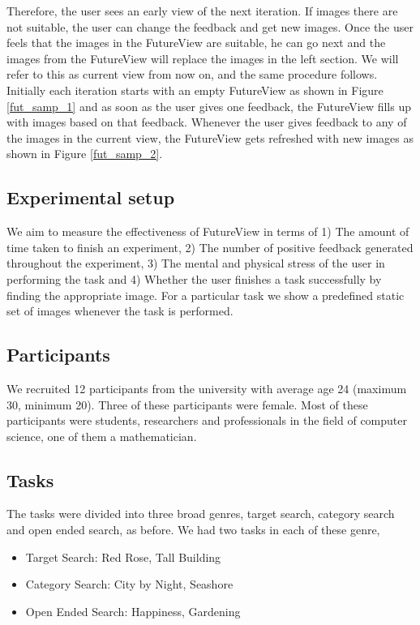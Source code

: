 \documentclass[english]{tktltiki}
\begin{document}
Therefore, the user sees an early view of the next iteration. If images there are not suitable, the user can change the feedback and get new images. Once the user feels that the images in the FutureView are suitable, he can go next and the images from the FutureView will replace the images in the left section. We will refer to this as current view from now on, and the same procedure follows. Initially each iteration starts with an empty FutureView as shown in Figure \ref{fut_samp_1} and as soon as the user gives one feedback, the FutureView fills up with images based on that feedback. Whenever the user gives feedback to any of the images in the current view, the FutureView gets refreshed with new images as shown in Figure \ref{fut_samp_2}.

\subsection{Experimental setup}

We aim to measure the effectiveness of FutureView in terms of 1) The amount of time taken to finish an experiment, 2) The number of positive feedback generated throughout the experiment, 3) The mental and physical stress of the user in performing the task and 4) Whether the user finishes a task successfully by finding the appropriate image. For a particular task we show a predefined static set of images whenever the task is performed.

\subsection{Participants}

We recruited 12 participants from the university with average age 24 (maximum 30, minimum 20). Three of these participants were female. Most of these participants were students, researchers and professionals in the field of computer science, one of them a mathematician.





\subsection{Tasks}

The tasks were divided into three broad genres, target search, category search and open ended search, as before. We had two tasks in each of these genre,

\begin{itemize}
	\item Target Search: Red Rose, Tall Building
	\item Category Search: City by Night, Seashore
	\item Open Ended Search: Happiness, Gardening
\end{itemize}
\end{document}
